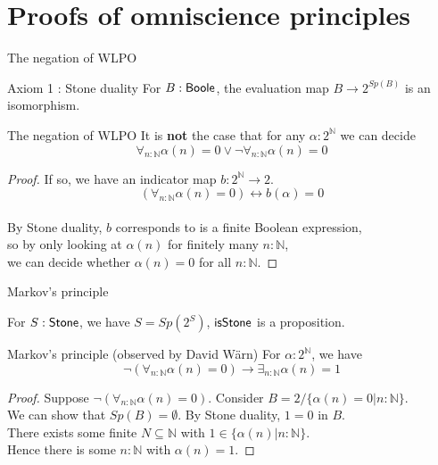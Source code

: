 \section{Proofs of omniscience principles}
\begin{frame}{The negation of WLPO}
  \begin{block}{Axiom 1 : Stone duality}
    For $B:\mathsf{Boole}$, the evaluation map $B \to 2^{Sp(B)}$ is an isomorphism. 
  \end{block}
  \pause
  \begin{block}{The negation of WLPO}
    It is \textbf{not} the case that for any $\alpha:2^\mathbb N$ we can decide 
    \vspace{-0.2cm}
    $$\forall_{n:\mathbb N} \alpha (n) = 0 \vee \neg \forall_{n:\mathbb N} \alpha (n) = 0 $$
  \end{block}
  \pause
  \begin{proof}
    If so, we have an indicator map $b:2^\mathbb N \to 2$. 
    \vspace{-0.2cm}
    $$(\forall_{n:\mathbb N} \alpha(n) = 0 )\leftrightarrow b(\alpha) = 0$$
    \vspace{-0.8cm}
    \\
    \pause 
    By Stone duality, $b$ corresponds to is a finite Boolean expression, \pause \\
    so by only looking at $\alpha(n)$ for finitely many $n:\mathbb N$, \pause \\
    we can decide whether $\alpha(n) = 0$ for all $n:\mathbb N$.
  \end{proof}
\end{frame}
\begin{frame}{Markov's principle}
  \begin{corollary}
    For $S:\mathsf{Stone}$, we have $S = Sp(2^S)$,
    $\mathsf{isStone}$ is a proposition.
  \end{corollary}
  \pause
  \begin{block}{Markov's principle (observed by David W\"arn)}
    For $\alpha:2^\mathbb N$, we have 
    \vspace{-0.2cm}
    $$\neg (\forall_{n:\mathbb N} \alpha(n) = 0) \to 
    \exists_{n:\mathbb N} \alpha(n) = 1
    $$
  \end{block}
  \begin{proof}
    Suppose $\neg(\forall_{n:\mathbb N}\alpha(n) = 0)$. 
    \pause 
    Consider $B = 2/\{\alpha(n)=0|n:\mathbb N\}$. \\
    \pause 
    We can show that $Sp(B) = \emptyset$. \pause
    By Stone duality, $1=0$ in $B$. 
    \\\pause 
    There exists some finite $N\subseteq \mathbb N$
    with $1\in \{\alpha(n)|n:\mathbb N\}$. 
    \pause \\
    Hence there is some $n:\mathbb N$ with $\alpha(n) = 1$. 
  \end{proof}
\end{frame}


